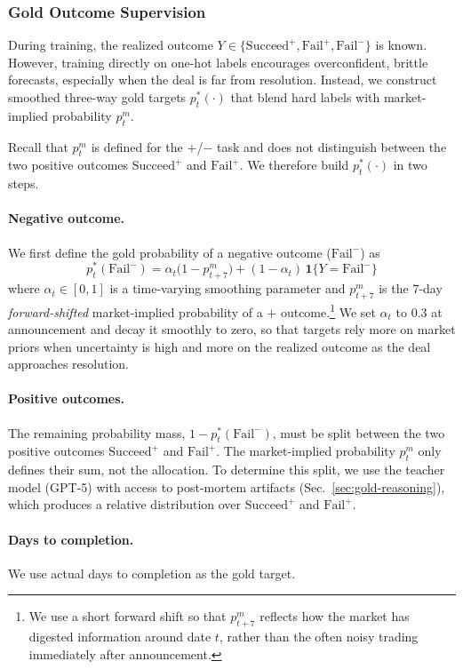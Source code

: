 \documentclass{article}
\theoremstyle{plain}
\theoremstyle{definition}
\theoremstyle{remark}
\newcommand{\Plus}{\boldsymbol{\mathrm{+}}}
\newcommand{\Minus}{\boldsymbol{\mathrm{-}}}
\newcommand{\SucceedPlus}{\boldsymbol{\mathrm{Succeed}^{+}}}
\newcommand{\FailPlus}{\boldsymbol{\mathrm{Fail}^{+}}}
\newcommand{\FailMinus}{\boldsymbol{\mathrm{Fail}^{-}}}
\begin{document}
\subsubsection{Gold Outcome Supervision}
\label{sec:gold-prob}

During training, the realized outcome $Y \in \{\SucceedPlus,\FailPlus,\FailMinus\}$ is known. However, training directly on one-hot labels encourages overconfident, brittle forecasts, especially when the deal is far from resolution. Instead, we construct smoothed three-way gold targets $p_t^{*}(\cdot)$ that blend hard labels with market-implied probability $p^m_t$. 

Recall that $p^m_t$ is defined for the $\Plus$/$\Minus$ task and does not distinguish between the two positive outcomes $\SucceedPlus$ and $\FailPlus$. We therefore build $p_t^{*}(\cdot)$ in two steps.

\paragraph{Negative outcome.}
We first define the gold probability of a negative outcome ($\FailMinus$) as
$$
p_t^{*}(\FailMinus)
= \alpha_t \bigl(1 - p^m_{t+7}\bigr)
+ (1 - \alpha_t)\,\mathbf{1}\{Y=\FailMinus\}
$$
where $\alpha_t \in [0,1]$ is a time-varying smoothing parameter and $p^m_{t+7}$ is the 7-day \emph{forward-shifted} market-implied probability of a $\Plus$ outcome.\footnote{We use a short forward shift so that $p^m_{t+7}$ reflects how the market has digested information around date $t$, rather than the often noisy trading immediately after announcement.}
We set $\alpha_t$ to $0.3$ at announcement and decay it smoothly to zero, so that targets rely more on market priors when uncertainty is high and more on the realized outcome as the deal approaches resolution.

\paragraph{Positive outcomes.}
The remaining probability mass, $1 - p_t^{*}(\FailMinus)$, must be split between the two positive outcomes $\SucceedPlus$ and $\FailPlus$.
The market-implied probability $p^m_t$ only defines their sum, not the allocation. To determine this split, we use the teacher
model (GPT-5) with access to post-mortem artifacts (Sec.~\ref{sec:gold-reasoning}),
which produces a relative distribution over $\SucceedPlus$ and $\FailPlus$.


\paragraph{Days to completion.} We use actual days to completion as the gold target.
\end{document}
